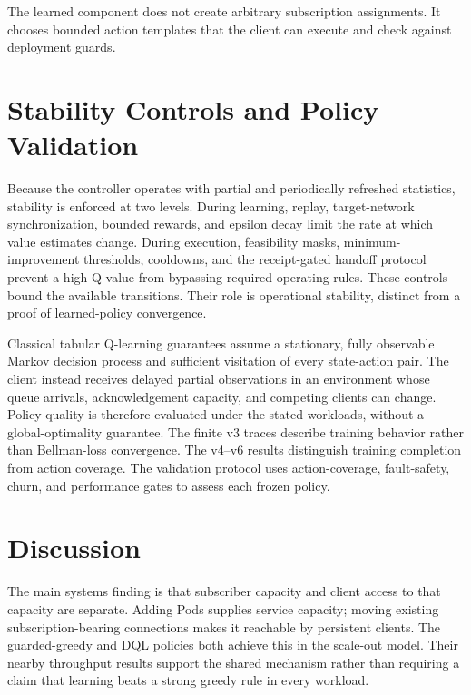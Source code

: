 \documentclass[manuscript]{acmart}
\begin{document}
The learned component does not create arbitrary subscription assignments.
It chooses bounded action templates that the client can execute and check
against deployment guards.





\section{Stability Controls and Policy Validation}

Because the controller operates with partial and periodically refreshed
statistics, stability is enforced at two levels.  During learning, replay,
target-network synchronization, bounded rewards, and epsilon decay limit the
rate at which value estimates change.  During execution, feasibility masks,
minimum-improvement thresholds, cooldowns, and the receipt-gated handoff protocol
prevent a high Q-value from bypassing required operating rules. These controls
bound the available transitions. Their role is operational stability, distinct
from a proof of learned-policy convergence.

Classical tabular Q-learning guarantees assume a stationary, fully observable
Markov decision process and sufficient visitation of every state-action pair.
The client instead receives delayed partial observations in an environment
whose queue arrivals, acknowledgement capacity, and competing clients can
change. Policy quality is therefore evaluated under the stated workloads,
without a global-optimality guarantee. The finite v3 traces describe training
behavior rather than Bellman-loss convergence. The v4--v6 results distinguish
training completion from action coverage. The validation protocol uses
action-coverage, fault-safety, churn, and performance gates to assess each
frozen policy.

\section{Discussion}

The main systems finding is that subscriber capacity and client access to that
capacity are separate. Adding Pods supplies service capacity; moving existing
subscription-bearing connections makes it reachable by persistent clients.
The guarded-greedy and DQL policies both achieve this in the scale-out model.
Their nearby throughput results support the shared mechanism rather than
requiring a claim that learning beats a strong greedy rule in every workload.
\end{document}
